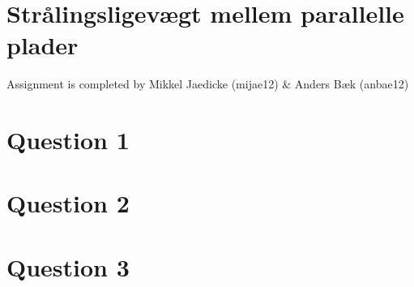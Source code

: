 \section*{Strålingsligevægt mellem parallelle plader}
Assignment is completed by Mikkel Jaedicke (mijae12) \& Anders Bæk (anbae12)
\section*{Question 1}

\section*{Question 2}
\section*{Question 3}